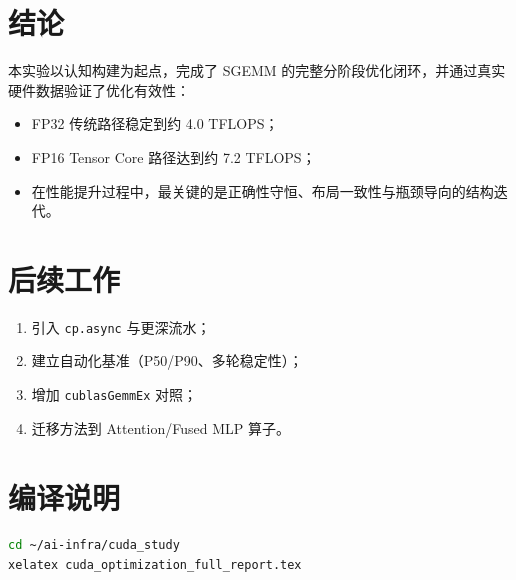 \documentclass[12pt,a4paper]{ctexart}
\begin{document}
\section{结论}
本实验以认知构建为起点，完成了 SGEMM 的完整分阶段优化闭环，并通过真实硬件数据验证了优化有效性：
\begin{itemize}[leftmargin=2em]
  \item FP32 传统路径稳定到约 4.0 TFLOPS；
  \item FP16 Tensor Core 路径达到约 7.2 TFLOPS；
  \item 在性能提升过程中，最关键的是正确性守恒、布局一致性与瓶颈导向的结构迭代。
\end{itemize}

\section{后续工作}
\begin{enumerate}[leftmargin=2em]
  \item 引入 \texttt{cp.async} 与更深流水；
  \item 建立自动化基准（P50/P90、多轮稳定性）；
  \item 增加 \texttt{cublasGemmEx} 对照；
  \item 迁移方法到 Attention/Fused MLP 算子。
\end{enumerate}

\appendix
\section{编译说明}
\begin{lstlisting}[language=bash]
cd ~/ai-infra/cuda_study
xelatex cuda_optimization_full_report.tex
\end{lstlisting}
\end{document}
